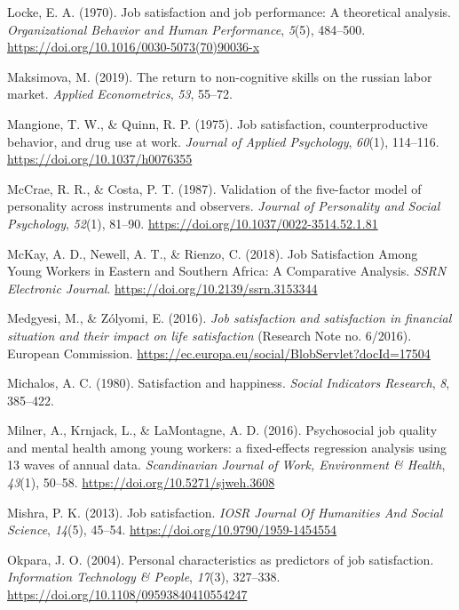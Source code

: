 \documentclass[
]{interact}
\newlength{\cslhangindent}
\newenvironment{CSLReferences}[2] %
 {\begin{list}{}{%
  \setlength{\itemindent}{0pt}
  \setlength{\leftmargin}{0pt}
  \setlength{\parsep}{0pt}
  \ifodd #1
   \setlength{\leftmargin}{\cslhangindent}
   \setlength{\itemindent}{-1\cslhangindent}
  \fi
  \setlength{\itemsep}{#2\baselineskip}}}
 {\end{list}}
\begin{document}
\begin{CSLReferences}{1}{0}
Locke, E. A. (1970). Job satisfaction and job performance: A theoretical
analysis. \emph{Organizational Behavior and Human Performance},
\emph{5}(5), 484--500.
\url{https://doi.org/10.1016/0030-5073(70)90036-x}

Maksimova, M. (2019). The return to non-cognitive skills on the russian
labor market. \emph{Applied Econometrics}, \emph{53}, 55--72.

Mangione, T. W., \& Quinn, R. P. (1975). Job satisfaction,
counterproductive behavior, and drug use at work. \emph{Journal of
Applied Psychology}, \emph{60}(1), 114--116.
\url{https://doi.org/10.1037/h0076355}

McCrae, R. R., \& Costa, P. T. (1987). Validation of the five-factor
model of personality across instruments and observers. \emph{Journal of
Personality and Social Psychology}, \emph{52}(1), 81--90.
\url{https://doi.org/10.1037/0022-3514.52.1.81}

McKay, A. D., Newell, A. T., \& Rienzo, C. (2018). Job Satisfaction
Among Young Workers in Eastern and Southern Africa: A Comparative
Analysis. \emph{SSRN Electronic Journal}.
\url{https://doi.org/10.2139/ssrn.3153344}

Medgyesi, M., \& Zólyomi, E. (2016). \emph{Job satisfaction and
satisfaction in financial situation and their impact on life
satisfaction} (Research Note no. 6/2016). European Commission.
\url{https://ec.europa.eu/social/BlobServlet?docId=17504}

Michalos, A. C. (1980). Satisfaction and happiness. \emph{Social
Indicators Research}, \emph{8}, 385--422.

Milner, A., Krnjack, L., \& LaMontagne, A. D. (2016). Psychosocial job
quality and mental health among young workers: a fixed-effects
regression analysis using 13 waves of annual data. \emph{Scandinavian
Journal of Work, Environment \& Health}, \emph{43}(1), 50--58.
\url{https://doi.org/10.5271/sjweh.3608}

Mishra, P. K. (2013). Job satisfaction. \emph{IOSR Journal Of Humanities
And Social Science}, \emph{14}(5), 45--54.
\url{https://doi.org/10.9790/1959-1454554}

Okpara, J. O. (2004). Personal characteristics as predictors of job
satisfaction. \emph{Information Technology \& People}, \emph{17}(3),
327--338. \url{https://doi.org/10.1108/09593840410554247}


\end{CSLReferences}
\end{document}

